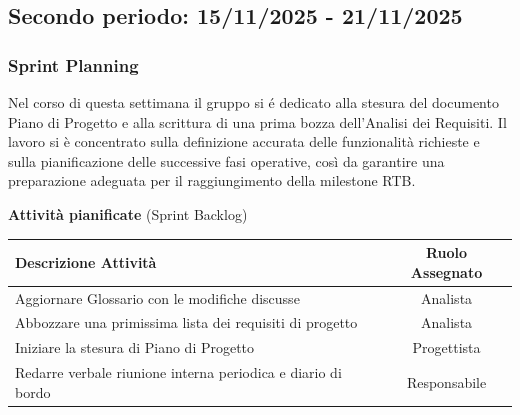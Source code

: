 \documentclass[a4paper, 11pt, oneside]{scrartcl} %
\begin{document}
\subsection{Secondo periodo: 15/11/2025 - 21/11/2025}

\subsubsection*{Sprint Planning}

Nel corso di questa settimana il gruppo si é dedicato alla stesura del documento Piano di Progetto e alla scrittura di una prima bozza dell’Analisi dei Requisiti. Il lavoro si è concentrato sulla definizione accurata delle funzionalità richieste e sulla pianificazione delle successive fasi operative, così da garantire una preparazione adeguata per il raggiungimento della milestone RTB.

\begin{table}[!ht]
\vspace{0.2cm}
\centering
{\large \textbf{Attività pianificate} (Sprint Backlog)} \\
\vspace{0.3cm}
\renewcommand{\arraystretch}{1.4}
\begin{tabularx}{\textwidth}{|X|c|} 
\hline
\rowcolor{white} 
\textbf{Descrizione Attività} & \textbf{Ruolo Assegnato} \\
\hline
Aggiornare Glossario con le modifiche discusse & Analista \\
Abbozzare una primissima lista dei requisiti di progetto & Analista \\
Iniziare la stesura di Piano di Progetto & Progettista \\
Redarre verbale riunione interna periodica e diario di bordo & Responsabile \\
\hline
\end{tabularx}
\end{table}
\FloatBarrier
\end{document}

